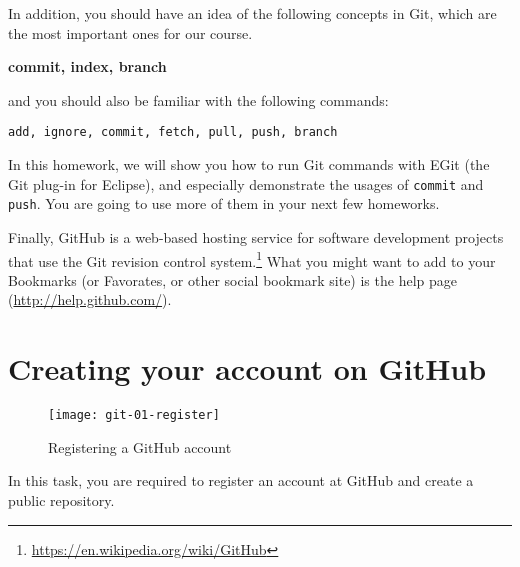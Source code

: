 In addition, you should have an idea of the following concepts in Git, which are
the most important ones for our course.

\begin{center}
\textbf{commit, index, branch}
\end{center}

\noindent and you should also be familiar with the following commands:

\begin{center}
\texttt{add, ignore, commit, fetch, pull, push, branch}
\end{center}

In this homework, we will show you how to run Git commands with EGit (the Git
plug-in for Eclipse), and especially demonstrate the usages of \texttt{commit}
and \texttt{push}. You are going to use more of them in your next few homeworks.

Finally, GitHub is a web-based hosting service for software development projects
that use the Git revision control
system.\footnote{\url{https://en.wikipedia.org/wiki/GitHub}} What you might want
to add to your Bookmarks (or Favorates, or other social bookmark site) is the
help page (\url{http://help.github.com/}).

\section{Creating your account on GitHub}

\begin{figure}[t]
\centering
\texttt{[image: git-01-register]}
\caption{Registering a GitHub account\label{git-01-register}}
\end{figure}

In this task, you are required to register an account at GitHub and create a
public repository.

